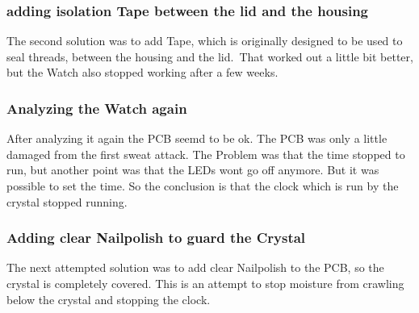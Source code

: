 \subsubsection{adding isolation Tape between the lid and the housing}
The second solution was to add Tape, which is originally designed to be used to seal threads, between the housing and the lid.\
That worked out a little bit better, but the Watch also stopped working after a few weeks. 
\subsubsection*{Analyzing the Watch again}
After analyzing it again the PCB seemd to be ok. The PCB was only a little damaged from the first sweat attack.
The Problem was that the time stopped to run, but another point was that the LEDs wont go off anymore. 
But it was possible to set the time. 
So the conclusion is that the clock which is run by the crystal stopped running.
\subsubsection{Adding clear Nailpolish to guard the Crystal}
The next attempted solution was to add clear Nailpolish to the PCB, so the crystal is completely covered. This is an attempt to stop moisture from crawling below the crystal and stopping the clock.